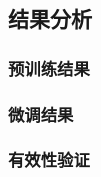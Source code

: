 \documentclass[a4paper]{zreport}
\begin{document}
\subsection{结果分析}

\subsubsection{预训练结果}

\subsubsection{微调结果}

\subsubsection{有效性验证}


\cite{*}

\newpage




\end{document}
